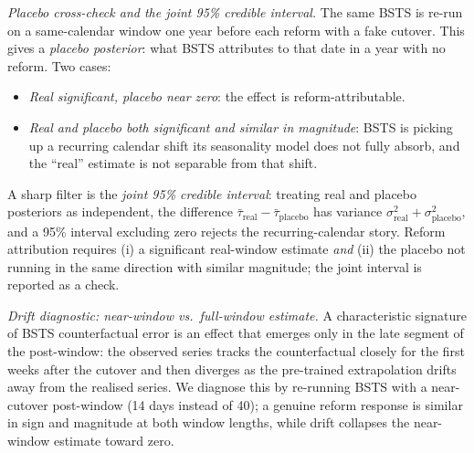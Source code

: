 \documentclass[11pt]{article}
\begin{document}
\emph{Placebo cross-check and the joint 95\% credible interval.} The same BSTS is re-run on a same-calendar window one year before each reform with a fake cutover. This gives a \emph{placebo posterior}: what BSTS attributes to that date in a year with no reform. Two cases:
\begin{itemize}\setlength{\itemsep}{1pt}
\item \emph{Real significant, placebo near zero}: the effect is reform-attributable.
\item \emph{Real and placebo both significant and similar in magnitude}: BSTS is picking up a recurring calendar shift its seasonality model does not fully absorb, and the ``real'' estimate is not separable from that shift.
\end{itemize}
A sharp filter is the \emph{joint 95\% credible interval}: treating real and placebo posteriors as independent, the difference $\bar\tau_{\text{real}} - \bar\tau_{\text{placebo}}$ has variance $\sigma^2_{\text{real}} + \sigma^2_{\text{placebo}}$, and a 95\% interval excluding zero rejects the recurring-calendar story. Reform attribution requires (i) a significant real-window estimate \emph{and} (ii) the placebo not running in the same direction with similar magnitude; the joint interval is reported as a check.

\emph{Drift diagnostic: near-window vs.\ full-window estimate.}\label{sec:drift-diagnostic} A characteristic signature of BSTS counterfactual error is an effect that emerges only in the late segment of the post-window: the observed series tracks the counterfactual closely for the first weeks after the cutover and then diverges as the pre-trained extrapolation drifts away from the realised series. We diagnose this by re-running BSTS with a near-cutover post-window (14 days instead of 40); a genuine reform response is similar in sign and magnitude at both window lengths, while drift collapses the near-window estimate toward zero.
\end{document}
